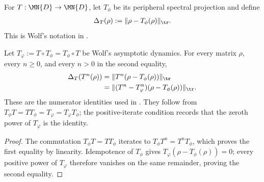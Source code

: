 \begin{definition}
    \label{def:trace_norm_asymptotic_distance}
    \leanok
    For $T:\MN{D}\to\MN{D}$, let $T_\phi$ be its peripheral spectral
    projection and define
    \begin{align}
        \Delta_T(\rho):=\lVert\rho-T_\phi(\rho)\rVert_{\tr}.
    \end{align}
    This is Wolf's notation in
    \cite[Chapter~8, Proposition ``Convergence towards asymptotic
        states'', Eq.~(8.112)]{Wolf2012Quantum}.
\end{definition}

\begin{lemma}
    \label{lem:trace_norm_asymptotic_distance_numerator}
    \leanok
    Let $T_\varphi:=T\circ T_\phi=T_\phi\circ T$ be Wolf's asymptotic
    dynamics. For every matrix $\rho$, every $n\geq0$, and every $n>0$ in
    the second equality,
    \begin{align}
        \Delta_T(T^n(\rho))
         & =\lVert T^n(\rho-T_\phi(\rho))\rVert_{\tr}               \\
         & =\lVert(T^n-T_\varphi^n)(\rho-T_\phi(\rho))\rVert_{\tr}.
        \label{eq:trace_norm_asymptotic_distance_numerator}
    \end{align}
    These are the numerator identities used in
    \cite[Chapter~8, Eq.~(8.114)]{Wolf2012Quantum}. They follow from
    $T_\phi T=TT_\phi=T_\varphi=T_\varphi T_\phi$; the positive-iterate
    condition records that the zeroth power of $T_\varphi$ is the identity.
\end{lemma}

\begin{proof}\leanok
    The commutation $T_\phi T=TT_\phi$ iterates to
    $T_\phi T^n=T^nT_\phi$, which proves the first equality by linearity.
    Idempotence of $T_\phi$ gives
    $T_\varphi(\rho-T_\phi(\rho))=0$; every positive power of
    $T_\varphi$ therefore vanishes on the same remainder, proving the second
    equality.
\end{proof}

